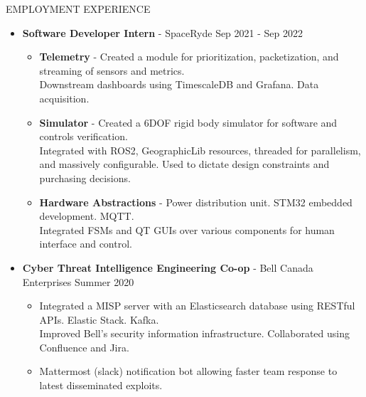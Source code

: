 \documentclass{resume} %
\begin{document}
\begin{rSection}{EMPLOYMENT EXPERIENCE}
    \begin{itemize}
        \item {\bf Software Developer Intern} - SpaceRyde \hfill {Sep 2021 - Sep 2022}
        \begin{itemize}[topsep=-10pt]
            \setlength\itemsep{-0.35em}
            \item[\textbullet] {\bf Telemetry} - Created a module for prioritization, packetization, and streaming of sensors and metrics.\\
            Downstream dashboards using TimescaleDB and Grafana. Data acquisition.
            \item[\textbullet] {\bf Simulator} - Created a 6DOF rigid body simulator for software and controls verification.\\
            Integrated with ROS2, GeographicLib resources, threaded for parallelism, and massively configurable.
            Used to dictate design constraints and purchasing decisions.
            \item[\textbullet] {\bf Hardware Abstractions} - Power distribution unit. STM32 embedded development. MQTT.\\
            Integrated FSMs and QT GUIs over various components for human interface and control.
        \end{itemize}
        \item {\bf Cyber Threat Intelligence Engineering Co-op} - Bell Canada Enterprises \hfill {Summer 2020}
        \begin{itemize}[topsep=-10pt]
            \setlength\itemsep{-0.35em}
            \item[\textbullet] Integrated a MISP server with an Elasticsearch database using RESTful APIs. Elastic Stack. Kafka.\\
            Improved Bell's security information infrastructure. Collaborated using Confluence and Jira.
            \item[\textbullet] Mattermost (slack) notification bot allowing faster team response to latest disseminated exploits.
        \end{itemize}
    \end{itemize}
\end{rSection}
\end{document}
